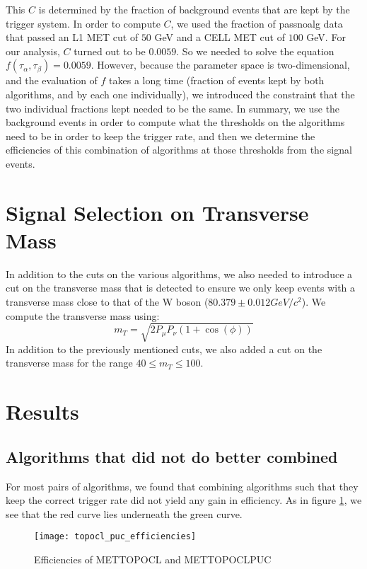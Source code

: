 This $C$ is determined by the fraction of background events that are kept by the trigger system. 
In order to compute $C$, we used the fraction of passnoalg data that passed an L1 MET cut of $50$ GeV and a CELL MET cut of $100$ GeV. 
For our analysis, $C$ turned out to be $0.0059$.
So we needed to solve the equation $f(\tau_{\alpha},\tau_{\beta})=0.0059$. 
However, because the parameter space is two-dimensional, and the evaluation of $f$ takes a long time (fraction of events kept by both algorithms, and by each one individually), we introduced the constraint that the two individual fractions kept needed to be the same.
In summary, we use the background events in order to compute what the thresholds on the algorithms need to be in order to keep the trigger rate, and then we determine the efficiencies of this combination of algorithms at those thresholds from the signal events. 
\section{Signal Selection on Transverse Mass}
In addition to the cuts on the various algorithms, we also needed to introduce a cut on the transverse mass that is detected to ensure we only keep events with a transverse mass close to that of the W boson ($80.379\pm 0.012 GeV/c^2$). 
We compute the transverse mass using:
$$m_{T}=\sqrt{2P_{\mu}P_{\nu}(1+\cos{(\phi)})}$$
In addition to the previously mentioned cuts, we also added a cut on the transverse mass for the range $40 \leq m_{T} \leq 100$. 
\pagebreak
\section{Results}
\subsection{Algorithms that did not do better combined}
For most pairs of algorithms, we found that combining algorithms such that they keep the correct trigger rate did not yield any gain in efficiency. As in figure \ref{no_gain_efficiency}, we see that the red curve lies underneath the green curve. 
\begin{figure}[h]
        \centering
        \texttt{[image: topocl\_puc\_efficiencies]}
        \caption{Efficiencies of METTOPOCL and METTOPOCLPUC}
        \label{no_gain_efficiency}
\end{figure}
\clearpage
